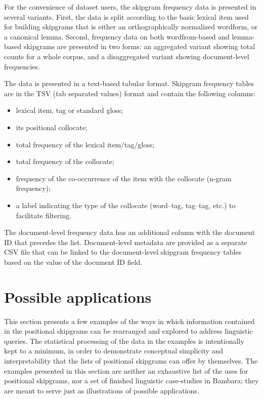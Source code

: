 \documentclass[12pt]{article}
\begin{document}
For the convenience of dataset users, the skipgram frequency data
is presented in several variants. First, the data is split
according to the basic lexical item used for building skipgrams that
is either an orthographically normalized wordform, or a canonical
lemma. Second, frequency data on both wordfrom-based and lemma-based
skipgrams are presented in two forms: an aggregated variant showing
total counts for a whole corpus, and a disaggregated variant showing
document-level frequencies. 

The data is presented in a text-based tabular format. Skipgram
frequency tables are in the TSV (tab separated values) format and
contain the following columns:
\begin{itemize}
\item lexical item, tag or standard gloss;
\item its positional collocate;
\item total frequency of the lexical item/tag/gloss;
\item total frequency of the collocate;
\item frequency of the co-occurrence of the item with the collocate
  (n-gram frequency);
\item a label indicating the type of the collocate (word--tag,
  tag--tag, etc.) to facilitate filtering.
\end{itemize}
The document-level frequency data has an additional column with the
document ID that precedes the list.  Document-level metadata are provided
as a separate CSV file that can be linked to the document-level
skipgram frequency tables based on the value of the document ID
field. 



\section{Possible applications}
\label{sec:applications}

This section presents a few examples of the ways in which information
contained in the positional skipgrams can be rearranged and explored
to address linguistic queries. The statistical processing of the data
in the examples is intentionally kept to a minimum, in order to
demonstrate conceptual simplicity and interpretability that the lists
of positional skipgrams can offer by themselves.  The examples
presented in this section are neither an exhaustive list of the uses
for positional skipgrams, nor a set of finished linguistic
case-studies in Bambara; they are meant to serve just as illustrations
of possible applications.
\end{document}
